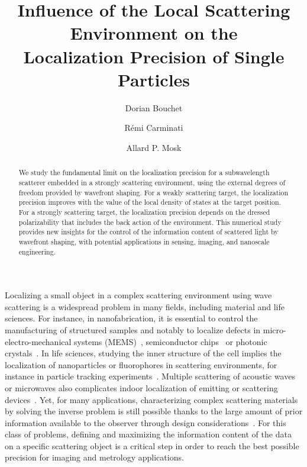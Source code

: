\documentclass[aps,prl,twocolumn,amsmath,amssymb,superscriptaddress,10pt,nobibnotes]{revtex4-2}
\begin{document}
\title{Influence of the Local Scattering Environment on the\\Localization Precision of Single Particles}

\author{Dorian Bouchet}
\author{Rémi Carminati}
\author{Allard P. Mosk}


\begin{abstract}
We study the fundamental limit on the localization precision for a subwavelength scatterer embedded in a strongly scattering environment, using the external degrees of freedom provided by wavefront shaping. For a weakly scattering target, the localization precision improves with the value of the local density of states at the target position. For a strongly scattering target, the localization precision depends on the dressed polarizability that includes the back action of the environment. This numerical study provides new insights for the control of the information content of scattered light by wavefront shaping, with potential applications in sensing, imaging, and nanoscale engineering.
\end{abstract}


\maketitle

Localizing a small object in a complex scattering environment using wave scattering is a widespread problem in many fields, including material and life sciences. For instance, in nanofabrication, it is essential to control the manufacturing of structured samples and notably to localize defects in micro-electro-mechanical systems (MEMS)~\cite{osten_optical_2018}, semiconductor chips~\cite{vogel_technology_2007,alexanderliddle_lithography_2011} or photonic crystals~\cite{koenderink_optical_2005}. In life sciences, studying the inner structure of the cell implies the localization of nanoparticles or fluorophores in scattering environments, for instance in particle tracking experiments~\cite{zijlstra_single_2011,taylor_interferometric_2019}. Multiple scattering of acoustic waves or microwaves also complicates indoor localization of emitting or scattering devices~\cite{deak_survey_2012,xiao_survey_2016}. Yet, for many applications, characterizing complex scattering materials by solving the inverse problem is still possible thanks to the large amount of prior information available to the observer through design considerations~\cite{szameit_sparsity-based_2012,zhang_far-field_2016}. For this class of problems, defining and maximizing the information content of the data on a specific scattering object is a critical step in order to reach the best possible precision for imaging and metrology applications. 
\end{document}
